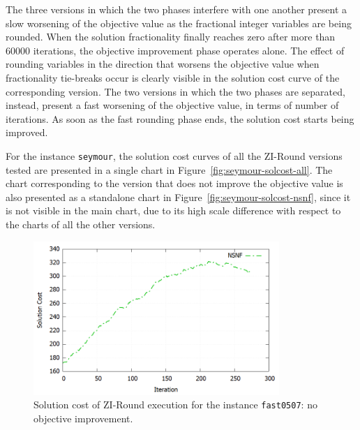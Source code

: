 \documentclass[a4paper,12pt]{book}
\begin{document}
The three versions in which the two phases interfere with one another present a slow worsening of the objective value as the fractional integer variables are being rounded. When the solution fractionality finally reaches zero after more than $60000$ iterations, the objective improvement phase operates alone. 
The effect of rounding variables in the direction that worsens the objective value when fractionality tie-breaks occur is clearly visible in the solution cost curve of the corresponding version.
The two versions in which the two phases are separated, instead, present a fast worsening of the objective value, in terms of number of iterations. As soon as the fast rounding phase ends, the solution cost starts being improved. \par

For the instance \texttt{seymour}, the solution cost curves of all the ZI-Round versions tested are presented in a single chart in Figure~\ref{fig:seymour-solcost-all}. The chart corresponding to the version that does not improve the objective value is also presented as a standalone chart in Figure~\ref{fig:seymour-solcost-nsnf}, since it is not visible in the main chart, due to its high scale difference with respect to the charts of all the other versions.

\begin{figure}[ht]
	\centering
	\includegraphics[width=0.83\textwidth]{fast0507-solcost-nsnf.png}
	\caption{Solution cost of ZI-Round execution for the instance \texttt{fast0507}: no objective improvement.}
	\label{fig:fast0507-solcost-nsnf}
\end{figure}
\end{document}
